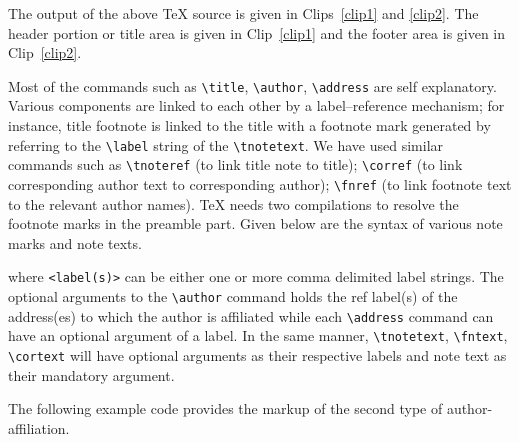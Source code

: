\documentclass[a4paper,12pt]{article}
\begin{document}
The output of the above TeX source is given in Clips~\ref{clip1} and
\ref{clip2}. The header portion or title area is given in Clip~\ref{clip1} and
the footer area is given in Clip~\ref{clip2}.

\vspace*{6pt}
\def\rulecolor{blue!70}
\def\rulecolor{orange}

\def\rulecolor{blue!70}
\def\rulecolor{orange}
\pagebreak

Most of the commands such as \verb+\title+, \verb+\author+,
\verb+\address+ are self explanatory.  Various components are
linked to each other by a label--reference mechanism; for
instance, title footnote is linked to the title with a footnote
mark generated by referring to the \verb+\label+ string of
the \verb=\tnotetext=.  We have used similar commands
such as \verb=\tnoteref= (to link title note to title);
\verb=\corref= (to link corresponding author text to
corresponding author); \verb=\fnref= (to link footnote text to
the relevant author names).  \TeX{} needs two compilations to
resolve the footnote marks in the preamble part.  
Given below are the syntax of various note marks and note texts.

\begin{vquote}
\end{vquote}

\noindent where \verb=<label(s)>= can be either one or more comma
delimited label strings. The optional arguments to the
\verb=\author= command holds the ref label(s) of the address(es)
to which the author is affiliated while each \verb=\address=
command can have an optional argument of a label. In the same
manner, \verb=\tnotetext=, \verb=\fntext=, \verb=\cortext= will
have optional arguments as their respective labels and note text
as their mandatory argument.

The following example code provides the markup of the second type
of author-affiliation.

\begin{vquote}
\author{C.V.~Radhakrishnan}
 \address{River Valley Technologies, SJP Building,
   Cotton Hills, Trivandrum, Kerala, India 695014}
\end{vquote}
\end{document}
